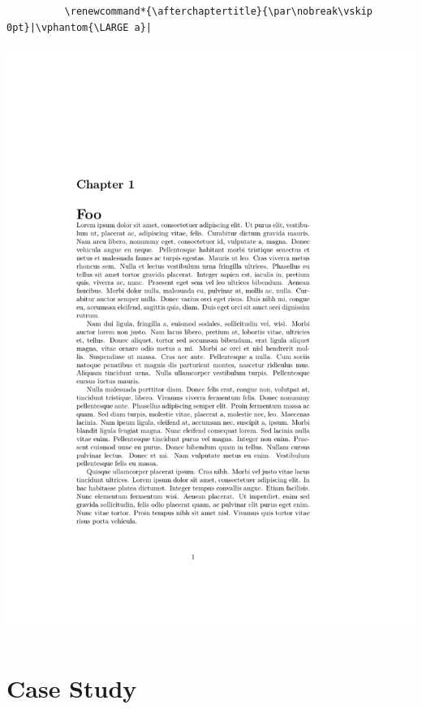\documentclass{beamer}
\begin{document}
\begin{frame}[fragile]
\begin{overprint}
\begin{columns}
      \begin{column}{0.5\textwidth}
        \begin{verbatim}
          \renewcommand*{\afterchaptertitle}{\par\nobreak\vskip 0pt}|\vphantom{\LARGE a}|
        \end{verbatim}
        \begin{center}
          \includegraphics[frame,page=1,width=0.8\linewidth]{afterchaptertitle-3}
        \end{center}
      \end{column}
    \end{columns}
  \end{overprint}
\end{frame}


\section{Case Study}
\end{document}
